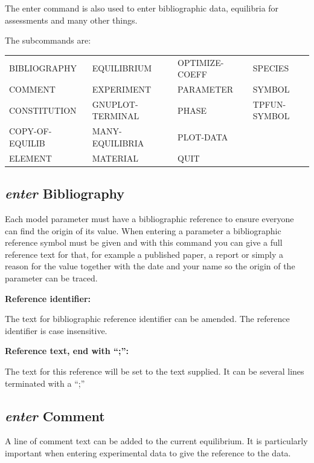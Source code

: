 \documentclass[11pt]{article}
\begin{document}
The enter command is also used to enter bibliographic data, equilibria
for assessments and many other things.

The subcommands are:

{\small
\begin{tabular}{llll}
 BIBLIOGRAPHY     & EQUILIBRIUM      & OPTIMIZE-COEFF~   & SPECIES\\
 COMMENT          & EXPERIMENT       & PARAMETER        & SYMBOL\\ 
 CONSTITUTION     & GNUPLOT-TERMINAL~ & PHASE            & TPFUN-SYMBOL\\ 
 COPY-OF-EQUILIB~  & MANY-EQUILIBRIA  & PLOT-DATA\\
 ELEMENT          & MATERIAL         & QUIT\\
\end{tabular}
}

\hypertarget{Enter bibliography}{}
\subsection{{\em enter} Bibliography}\label{sc:bibref}

Each model parameter must have a bibliographic reference to ensure
everyone can find the origin of its value.  When entering a parameter
a bibliographic reference symbol must be given and with this command
you can give a full reference text for that, for example a published
paper, a report or simply a reason for the value together with the
date and your name so the origin of the parameter can be traced.

{\bf Reference identifier:}

The text for bibliographic reference identifier can be amended.  The
reference identifier is case insensitive.

{\bf Reference text, end with ``;'':}

The text for this reference will be set to the text supplied.  It can be
several lines terminated with a ``;''

\hypertarget{Enter comment}{}
\subsection{{\em enter} Comment}

A line of comment text can be added to the current equilibrium.  It is
particularly important when entering experimental data to give the
reference to the data.
\end{document}
